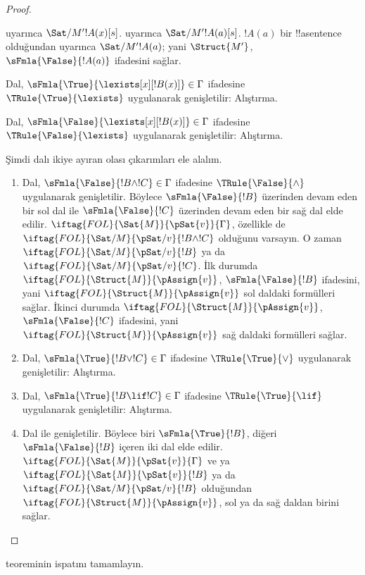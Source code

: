 \begin{proof}
\begin{enumerate}
{   uyarınca
  $\Sat/{M'}{!A(x)}[s]$.  uyarınca
  $\Sat/{M'}{!A(a)}[s]$. $!A(a)$ bir !!a{sentence} olduğundan
   uyarınca
  $\Sat/{M'}{!A(a)}$; yani $\Struct{M'}$,
  $\sFmla{\False}{!A(a)}$ ifadesini sağlar.
\item Dal, $\sFmla{\True}{\lexists[x][!B(x)]} \in \Gamma$ ifadesine
  $\TRule{\True}{\lexists}$ uygulanarak genişletilir: Alıştırma.
\item Dal, $\sFmla{\False}{\lexists[x][!B(x)]} \in \Gamma$ ifadesine
  $\TRule{\False}{\lexists}$ uygulanarak genişletilir: Alıştırma.}{}
\end{enumerate}
Şimdi dalı ikiye ayıran olası çıkarımları ele alalım.
\begin{enumerate}
\item Dal, $\sFmla{\False}{!B \land !C} \in \Gamma$ ifadesine
  $\TRule{\False}{\land}$ uygulanarak genişletilir. Böylece
  $\sFmla{\False}{!B}$ üzerinden devam eden bir sol dal ile
  $\sFmla{\False}{!C}$ üzerinden devam eden bir sağ dal elde edilir.
  $\iftag{FOL}{\Sat{M}}{\pSat{v}}{\Gamma}$, özellikle de
  $\iftag{FOL}{\Sat/{M}}{\pSat/{v}}{!B \land !C}$ olduğunu varsayın. O zaman
  $\iftag{FOL}{\Sat/{M}}{\pSat/{v}}{!B}$ ya da
  $\iftag{FOL}{\Sat/{M}}{\pSat/{v}}{!C}$. İlk durumda
  $\iftag{FOL}{\Struct{M}}{\pAssign{v}}$, $\sFmla{\False}{!B}$ ifadesini,
  yani $\iftag{FOL}{\Struct{M}}{\pAssign{v}}$ sol daldaki formülleri sağlar.
  İkinci durumda $\iftag{FOL}{\Struct{M}}{\pAssign{v}}$,
  $\sFmla{\False}{!C}$ ifadesini, yani
  $\iftag{FOL}{\Struct{M}}{\pAssign{v}}$ sağ daldaki formülleri sağlar.
\item Dal, $\sFmla{\True}{!B \lor !C} \in \Gamma$ ifadesine
  $\TRule{\True}{\lor}$ uygulanarak genişletilir: Alıştırma.
\item Dal, $\sFmla{\True}{!B \lif !C} \in \Gamma$ ifadesine
  $\TRule{\True}{\lif}$ uygulanarak genişletilir: Alıştırma.
\item Dal \Cut{} ile genişletilir. Böylece biri $\sFmla{\True}{!B}$,
  diğeri $\sFmla{\False}{!B}$ içeren iki dal elde edilir.
  $\iftag{FOL}{\Sat{M}}{\pSat{v}}{\Gamma}$ ve ya
  $\iftag{FOL}{\Sat{M}}{\pSat{v}}{!B}$ ya da
  $\iftag{FOL}{\Sat/{M}}{\pSat/{v}}{!B}$ olduğundan
  $\iftag{FOL}{\Struct{M}}{\pAssign{v}}$, sol ya da sağ daldan birini
  sağlar.
\end{enumerate}
\end{proof}

\begin{prob}
 teoreminin ispatını tamamlayın.
\end{prob}
\tagendprob

